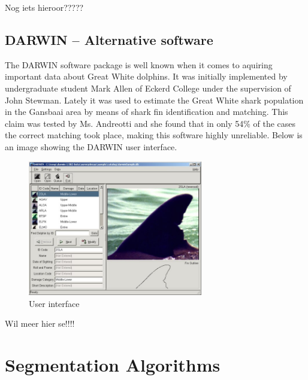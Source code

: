 \documentclass[a4paper,10pt]{article}
\begin{document}
Nog iets hieroor?????

\newpage
\subsection{DARWIN -- Alternative software}
The DARWIN\cite{Darwin} software package is well known when it comes to aquiring
important data about Great White dolphins.  It was initially implemented by
undergraduate 
student Mark Allen of Eckerd College under the supervision of John Stewman. 
Lately it was used to estimate the Great White
shark population in the Gansbaai area by means of shark fin identification and
matching.  This claim was tested by Ms. Andreotti and she found that in only
54\% of the cases the correct matching took place, making this software highly
unreliable.  Below is an image showing the DARWIN user interface. 

\begin{figure}[H]
 \centering
 \includegraphics[width=3in]{Darwin.jpg}
 \caption{User interface}
\end{figure}

Wil meer hier se!!!!



\newpage
\section{Segmentation Algorithms}
\end{document}

